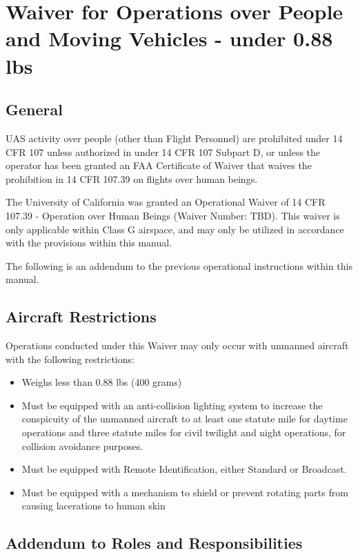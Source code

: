 \documentclass[
]{book}
\providecommand{\tightlist}{%
  \setlength{\itemsep}{0pt}\setlength{\parskip}{0pt}}
\begin{document}
\chapter{Waiver for Operations over People and Moving Vehicles - under 0.88 lbs}\label{ch-part39-U88}

\section{General}\label{s39u88-gen}

UAS activity over people (other than Flight Personnel) are prohibited under 14 CFR 107 unless authorized in under 14 CFR 107 Subpart D, or unless the operator has been granted an FAA Certificate of Waiver that waives the prohibition in 14 CFR 107.39 on flights over human beings.

The University of California was granted an Operational Waiver of 14 CFR 107.39 - Operation over Human Beings (Waiver Number: TBD). This waiver is only applicable within Class G airspace, and may only be utilized in accordance with the provisions within this manual.

The following is an addendum to the previous operational instructions within this manual.

\section{Aircraft Restrictions}\label{s39u88-ar}

Operations conducted under this Waiver may only occur with unmanned aircraft with the following restrictions:

\begin{itemize}
\tightlist
\item
  Weighs less than 0.88 lbs (400 grams)
\item
  Must be equipped with an anti-collision lighting system to increase the conspicuity of the unmanned aircraft to at least one statute mile for daytime operations and three statute miles for civil twilight and night operations, for collision avoidance purposes.
\item
  Must be equipped with Remote Identification, either Standard or Broadcast.
\item
  Must be equipped with a mechanism to shield or prevent rotating parts from causing lacerations to human skin
\end{itemize}

\section{Addendum to Roles and Responsibilities}\label{s39u88-rr}
\end{document}
